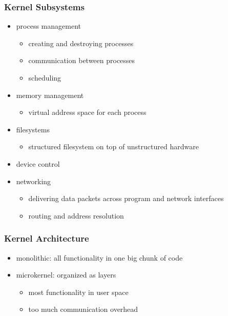 \documentclass[dvipsnames]{beamer}
\begin{document}
\begin{frame}
  \frametitle{Kernel Subsystems}

  \begin{itemize}
    \item process management
    \begin{itemize}
      \item creating and destroying processes
      \item communication between processes
      \item scheduling
    \end{itemize}

    \item memory management
    \begin{itemize}
      \item virtual address space for each process
    \end{itemize}

    \item filesystems
    \begin{itemize}
      \item structured filesystem on top of unstructured hardware
    \end{itemize}

    \item device control

    \item networking
    \begin{itemize}
      \item delivering data packets across program and network interfaces
      \item routing and address resolution
    \end{itemize}
  \end{itemize}
\end{frame}

\begin{frame}
  \frametitle{Kernel Architecture}

  \begin{itemize}
    \item \alert{monolithic}: all functionality in one big chunk of code

    \bigskip
    \item \alert{microkernel}: organized as layers
    \begin{itemize}
      \item most functionality in user space
      \item too much communication overhead
    \end{itemize}
  \end{itemize}
\end{frame}
\end{document}
